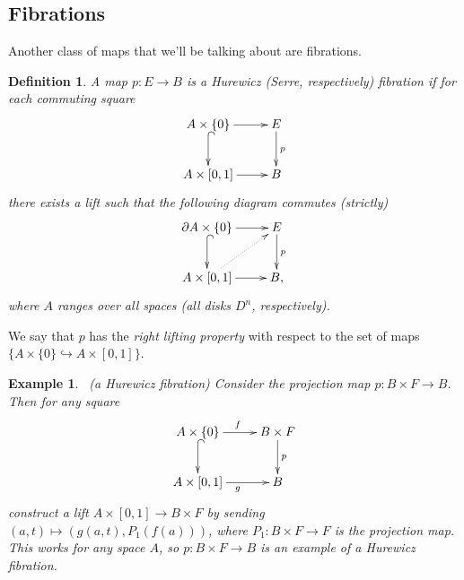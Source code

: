 \documentclass{article}
\newtheorem{definition}[theorem]{Definition}
\newtheorem{example}[theorem]{Example}
\newtheorem{proposed work}[theorem]{Proposed Work}
\newcommand{\xymat}[1]{\begin{align*}\xymatrix{ #1}\end{align*}}
\begin{document}
\subsection{Fibrations}
Another class of maps that we'll be talking about are fibrations.
\begin{definition}
A map $p:E\to B$ is a Hurewicz (Serre, respectively) fibration if for each commuting square
\xymat{A\times \lbrace 0\rbrace \ar[r] \ar@{^{(}->}[d] & E \ar[d]^p \\ A\times [0,1] \ar[r] & B} 
there exists a lift such that the following diagram commutes (strictly)
\xymat{\partial A\times \lbrace 0\rbrace \ar[r] \ar@{^{(}->}[d] & E \ar[d]^p \\ A\times [0,1] \ar[r]\ar@{.>}[ur] & B,}
where $A$ ranges over all spaces (all disks $D^n$, respectively).
\end{definition}
We say that $p$ has the \textit{right lifting property} with respect to the set of maps $\lbrace A\times \lbrace 0\rbrace\hookrightarrow A\times [0,1]\rbrace$.

\begin{example}~\label{projfib}(a Hurewicz fibration) Consider the projection map $p: B\times F\to B$. Then for any square
\xymat{A\times \lbrace 0\rbrace \ar[r]^f \ar@{^{(}->}[d] & B\times F \ar[d]^p \\ A\times [0,1] \ar[r]_g & B}
construct a lift $A \times [0,1] \to B \times F$ by sending $(a,t)\mapsto (g(a,t), P_1(f(a)))$, where $P_1: B\times F\to F$ is the projection map. This works for any space $A$, so $p : B\times F\to B$ is an example of a Hurewicz fibration. 
\end{example}
\end{document}

